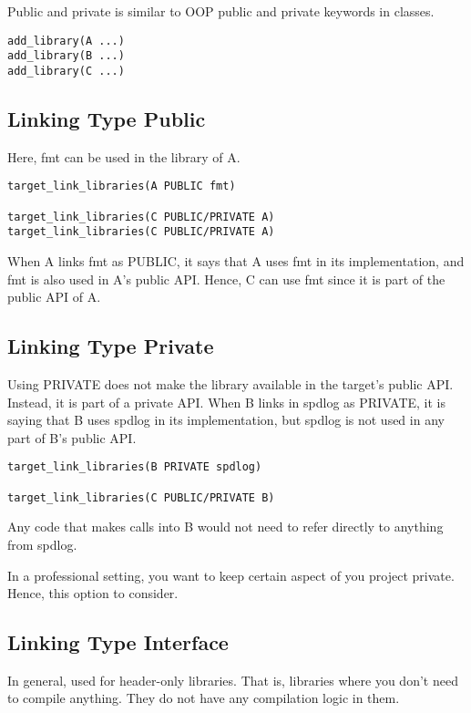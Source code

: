 \documentclass[openany]{report}
\begin{document}
Public and private is similar to OOP public and private keywords in classes.

\begin{verbatim}
add_library(A ...)
add_library(B ...)
add_library(C ...)
\end{verbatim}

\subsection{Linking Type Public}

Here, fmt can be used in the library of A. 

\begin{verbatim}
target_link_libraries(A PUBLIC fmt)

target_link_libraries(C PUBLIC/PRIVATE A)
target_link_libraries(C PUBLIC/PRIVATE A)
\end{verbatim}

When A links fmt as PUBLIC, it says that A uses fmt in its implementation, and fmt is also used in A's public API.
Hence, C can use fmt since it is part of the public API of A.

\subsection{Linking Type Private}

Using PRIVATE does not make the library available in the target's public API. Instead, it is part of a private API.
When B links in spdlog as PRIVATE, it is saying that B uses spdlog in its implementation,
but spdlog is not used in any part of B's public API. 

\begin{verbatim}
target_link_libraries(B PRIVATE spdlog)

target_link_libraries(C PUBLIC/PRIVATE B)
\end{verbatim}

Any code that makes calls into B would not need to refer directly to anything from
spdlog.


In a professional setting, you want to keep certain aspect of you project private. Hence, this option to consider.

\subsection{Linking Type Interface}

In general, used for header-only libraries. That is, libraries where you don't need to compile anything. They do not have
any compilation logic in them.
\end{document}
